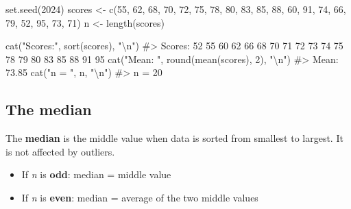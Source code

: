 \documentclass[
  11pt,
  a4paper,
  oneside,
  open=any]{scrbook}
\newenvironment{Shaded}{\begin{snugshade}}{\end{snugshade}}
\newcommand{\CommentTok}[1]{\textcolor[rgb]{0.37,0.37,0.37}{#1}}
\newcommand{\DecValTok}[1]{\textcolor[rgb]{0.68,0.00,0.00}{#1}}
\newcommand{\FunctionTok}[1]{\textcolor[rgb]{0.28,0.35,0.67}{#1}}
\newcommand{\NormalTok}[1]{\textcolor[rgb]{0.00,0.23,0.31}{#1}}
\newcommand{\OtherTok}[1]{\textcolor[rgb]{0.00,0.23,0.31}{#1}}
\newcommand{\SpecialCharTok}[1]{\textcolor[rgb]{0.37,0.37,0.37}{#1}}
\newcommand{\StringTok}[1]{\textcolor[rgb]{0.13,0.47,0.30}{#1}}
\providecommand{\tightlist}{%
  \setlength{\itemsep}{0pt}\setlength{\parskip}{0pt}}
\begin{document}
\begin{Shaded}
\begin{Highlighting}[]
\FunctionTok{set.seed}\NormalTok{(}\DecValTok{2024}\NormalTok{)}
\NormalTok{scores }\OtherTok{\textless{}{-}} \FunctionTok{c}\NormalTok{(}\DecValTok{55}\NormalTok{, }\DecValTok{62}\NormalTok{, }\DecValTok{68}\NormalTok{, }\DecValTok{70}\NormalTok{, }\DecValTok{72}\NormalTok{, }\DecValTok{75}\NormalTok{, }\DecValTok{78}\NormalTok{, }\DecValTok{80}\NormalTok{, }\DecValTok{83}\NormalTok{, }\DecValTok{85}\NormalTok{,}
            \DecValTok{88}\NormalTok{, }\DecValTok{60}\NormalTok{, }\DecValTok{91}\NormalTok{, }\DecValTok{74}\NormalTok{, }\DecValTok{66}\NormalTok{, }\DecValTok{79}\NormalTok{, }\DecValTok{52}\NormalTok{, }\DecValTok{95}\NormalTok{, }\DecValTok{73}\NormalTok{, }\DecValTok{71}\NormalTok{)}
\NormalTok{n }\OtherTok{\textless{}{-}} \FunctionTok{length}\NormalTok{(scores)}

\FunctionTok{cat}\NormalTok{(}\StringTok{"Scores:"}\NormalTok{, }\FunctionTok{sort}\NormalTok{(scores), }\StringTok{"}\SpecialCharTok{\textbackslash{}n}\StringTok{"}\NormalTok{)}
\CommentTok{\#\textgreater{} Scores: 52 55 60 62 66 68 70 71 72 73 74 75 78 79 80 83 85 88 91 95}
\FunctionTok{cat}\NormalTok{(}\StringTok{"Mean:  "}\NormalTok{, }\FunctionTok{round}\NormalTok{(}\FunctionTok{mean}\NormalTok{(scores), }\DecValTok{2}\NormalTok{), }\StringTok{"}\SpecialCharTok{\textbackslash{}n}\StringTok{"}\NormalTok{)}
\CommentTok{\#\textgreater{} Mean:   73.85}
\FunctionTok{cat}\NormalTok{(}\StringTok{"n =    "}\NormalTok{, n, }\StringTok{"}\SpecialCharTok{\textbackslash{}n}\StringTok{"}\NormalTok{)}
\CommentTok{\#\textgreater{} n =     20}
\end{Highlighting}
\end{Shaded}

\subsection{The median}\label{the-median}

The \textbf{median} is the middle value when data is sorted from
smallest to largest. It is not affected by outliers.

\begin{itemize}
\tightlist
\item
  If \emph{n} is \textbf{odd}: median = middle value
\item
  If \emph{n} is \textbf{even}: median = average of the two middle
  values
\end{itemize}
\end{document}
